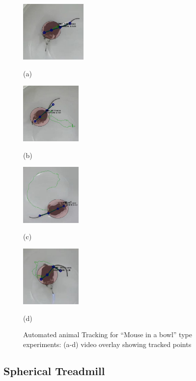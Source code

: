 \begin{figure}[htb]
  \begin{minipage}[t]{0.24\linewidth}\centering
    \includegraphics[height=3cm]{07mousedata1close.jpg}
    \centerline{(a)}
  \end{minipage}\hfill
  \begin{minipage}[t]{0.24\linewidth}\centering
    \includegraphics[width=3cm]{06mousedata1.jpg}
        \centerline{(b)}
  \end{minipage}
  \begin{minipage}[t]{0.24\linewidth}\centering
    \includegraphics[width=3cm]{08mousedata2.jpg}
    \centerline{(c)}
  \end{minipage}
    \begin{minipage}[t]{0.24\linewidth}\centering
    \includegraphics[width=3cm]{09mousedata1fiberon1.jpg}
    \centerline{(d)}
  \end{minipage}
  \caption{Automated animal Tracking for ``Mouse in a bowl'' type experiments: (a-d) video overlay showing tracked points}
  \label{fig:Sampling}
\end{figure}

\subsection{Spherical Treadmill}\label{spherical-treadmill}

